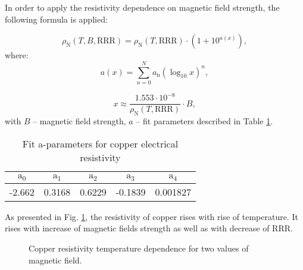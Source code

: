 In order to apply the resistivity dependence on magnetic field strength, the following formula is applied:

\begin{equation}
    \rho_\text{N}(T, B, \text{RRR}) = \rho_\text{N}(T, \text{RRR}) \cdot (1 + 10^{a(x)}),  
\end{equation}
where:
\begin{equation}
    a(x) = \sum_{n=0}^{N} a_\text{n}(\log_\text{10}x)^{n},
\end{equation}

\begin{equation}
    x \approx \frac{1.553 \cdot 10^{-8}}{\rho_\text{N}(T, \text{RRR})} \cdot B,
\end{equation}
with $B$ -- magnetic field strength, $a$ -- fit parameters described in Table \ref{table:nist_resistivity_parameters2}.

\begin{table}[h!]
    \caption{Fit a-parameters for copper electrical resistivity} 
    \vspace{-1.em} 
    \fontsize{10}{10}
    \selectfont 
    \renewcommand{\arraystretch}{1.5}
    \begin{center}
    \begin{tabular}{ ccccc }  
    $\text{a}_0$ & $\text{a}_1$ & $\text{a}_2$ & $\text{a}_3$ & $\text{a}_4$ \\
    \hline
    -2.662 & 0.3168 & 0.6229 & -0.1839 & 0.001827 \\
    \hline
    \end{tabular}
    \end{center}  
     \label{table:nist_resistivity_parameters2} 
 \end{table}

As presented in Fig. \ref{fig:cu_resistivity_plot}, the resistivity of copper rises with rise of temperature. It rises with increase of magnetic fields strength as well as with decrease of RRR.

\begin{figure}[h!]
\centering
{}
\caption{Copper resistivity temperature dependence for two values of magnetic field.}
    \label{fig:cu_resistivity_plot}
\end{figure}

